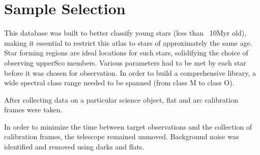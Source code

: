 \section{Sample Selection}

This database was built to better classify young stars (less than ~10Myr old), making it essential to restrict this atlas to stars of approximately the same age.  
Star forming regions are ideal locations for such stars, solidifying the choice of observing upperSco members.  Various parameters had to be met by each star before it was chosen for observation.  In order to build a comprehensive library, a wide spectral class range needed to be spanned (from class M to class O).  



After collecting data on a particular science object, flat and arc calibration frames were taken.  

In order to minimize the time between target observations and the collection of calibration frames, the telescope remained unmoved.  Background noise was identified and removed using darks and flats.